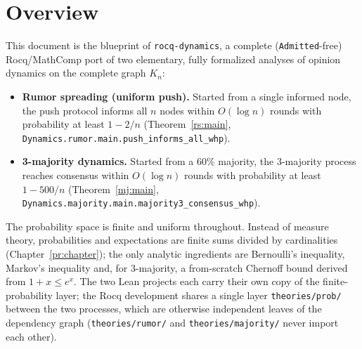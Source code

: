 
\chapter*{Overview}

This document is the blueprint of \texttt{rocq-dynamics}, a complete
(\texttt{Admitted}-free) Rocq/MathComp port of two elementary, fully
formalized analyses of opinion dynamics on the complete graph $K_n$:

\begin{itemize}
\item \textbf{Rumor spreading (uniform push).} Started from a single informed
  node, the push protocol informs all $n$ nodes within $O(\log n)$ rounds with
  probability at least $1 - 2/n$ (Theorem~\ref{rs:main},
  \texttt{Dynamics.rumor.main.push\_informs\_all\_whp}).
\item \textbf{3-majority dynamics.} Started from a $60\%$ majority, the
  3-majority process reaches consensus within $O(\log n)$ rounds with
  probability at least $1 - 500/n$ (Theorem~\ref{mj:main},
  \texttt{Dynamics.majority.main.majority3\_consensus\_whp}).
\end{itemize}

The probability space is finite and uniform throughout. Instead of measure
theory, probabilities and expectations are finite sums divided by
cardinalities (Chapter~\ref{pr:chapter}); the only analytic ingredients are
Bernoulli's inequality, Markov's inequality and, for 3-majority, a
from-scratch Chernoff bound derived from $1 + x \le e^x$. The two Lean
projects each carry their own copy of the finite-probability layer; the Rocq
development shares a single layer \texttt{theories/prob/} between the two
processes, which are otherwise independent leaves of the dependency graph
(\texttt{theories/rumor/} and \texttt{theories/majority/} never import each
other).

